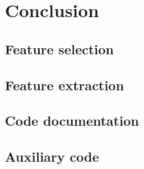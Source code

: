 \documentclass[
  oneside,
  11pt, a4paper,
  footinclude=true,
  headinclude=true,
  cleardoublepage=empty
]{scrbook}
\begin{document}
\part{Conclusion}
% 

%
		
\cleardoublepage



\printglossary
\printglossary[type=\acronymtype]

\appendix
\renewcommand\chaptername{Appendix}

\chapter{Feature selection}
\label{apdx:sec:feature_selection}


\chapter{Feature extraction}
\label{apdx:sec:feature_extraction}


\chapter{Code documentation}
\label{apdx:sec:code_documentation}


\chapter{Auxiliary code}
\label{apdx:sec:tools}


\begin{backcover}
\thispagestyle{empty} \pagecolor{white} \textcolor{black} {\selectfont ~\vfill
\noindent
%
\vfill ~}
\end{backcover}
\end{document}
